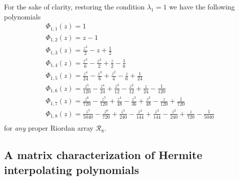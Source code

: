 For the sake of clarity, restoring the condition $\lambda_{1}=1$ we have the following polynomials
\begin{displaymath}
\begin{array}{c}
 \Phi_{ 1, 1 }{\left (z \right )} = 1\\
 \Phi_{ 1, 2 }{\left (z \right )} = z - 1\\
 \Phi_{ 1, 3 }{\left (z \right )} = \frac{z^{2}}{2} - z + \frac{1}{2}\\
 \Phi_{ 1, 4 }{\left (z \right )} = \frac{z^{3}}{6} - \frac{z^{2}}{2} + \frac{z}{2} - \frac{1}{6}\\
 \Phi_{ 1, 5 }{\left (z \right )} = \frac{z^{4}}{24} - \frac{z^{3}}{6} + \frac{z^{2}}{4} - \frac{z}{6} + \frac{1}{24}\\
 \Phi_{ 1, 6 }{\left (z \right )} = \frac{z^{5}}{120} - \frac{z^{4}}{24} + \frac{z^{3}}{12} - \frac{z^{2}}{12} + \frac{z}{24} - \frac{1}{120}\\
 \Phi_{ 1, 7 }{\left (z \right )} = \frac{z^{6}}{720} - \frac{z^{5}}{120} + \frac{z^{4}}{48} - \frac{z^{3}}{36} + \frac{z^{2}}{48} - \frac{z}{120} + \frac{1}{720}\\
 \Phi_{ 1, 8 }{\left (z \right )} = \frac{z^{7}}{5040} - \frac{z^{6}}{720} + \frac{z^{5}}{240} - \frac{z^{4}}{144} + \frac{z^{3}}{144} - \frac{z^{2}}{240} + \frac{z}{720} - \frac{1}{5040}\\
\end{array}
\end{displaymath}
for \textit{any} proper Riordan array $\mathcal{R}_{8}$.

\subsection{A matrix characterization of Hermite interpolating polynomials}

